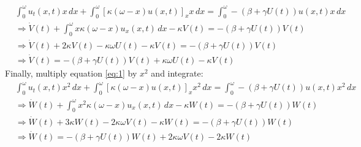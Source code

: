\documentclass{article}
\begin{document}
\begin{subequations}
  \begin{align}
    &\int_0^{\omega} u_t(x,t)x\,dx + \int_0^{\omega} [\kappa(\omega-x)u(x,t)]_x x \, dx = \int_0^{\omega} -(\beta+\gamma U(t)) u(x,t)x\, dx\\
    &\Rightarrow \dot{V}(t) + \int_0^{\omega} x\kappa(\omega-x)u_x(x,t)\,dx - \kappa V(t) = -(\beta+\gamma U(t)) V(t)\\%
    &\Rightarrow\dot{V}(t) + 2\kappa V(t) - \kappa \omega U(t) - \kappa V(t) = -(\beta+\gamma U(t)) V(t)\\
    &\Rightarrow \dot{V}(t) = -(\beta+\gamma U(t)) V(t) + \kappa \omega U(t) - \kappa V(t)
  \end{align}
\end{subequations}
Finally, multiply equation \ref{eq:1} by $x^2$ and integrate:
\begin{subequations}
  \begin{align}
    &\int_0^{\omega} u_t(x,t)x^2\,dx + \int_0^{\omega} [\kappa(\omega-x)u(x,t)]_x x^2 \, dx = \int_0^{\omega} -(\beta+\gamma U(t)) u(x,t)x^2\, dx\\
    &\Rightarrow \dot{W}(t) + \int_0^{\omega} x^2\kappa(\omega-x)u_x(x,t)\,dx - \kappa W(t) = -(\beta+\gamma U(t)) W(t)\\%
    &\Rightarrow\dot{W}(t) + 3\kappa W(t) - 2\kappa \omega V(t) - \kappa W(t) = -(\beta+\gamma U(t)) W(t)\\
    &\Rightarrow \dot{W}(t) = -(\beta+\gamma U(t)) W(t) + 2\kappa \omega V(t) - 2\kappa W(t)
  \end{align}
\end{subequations}
\end{document}
